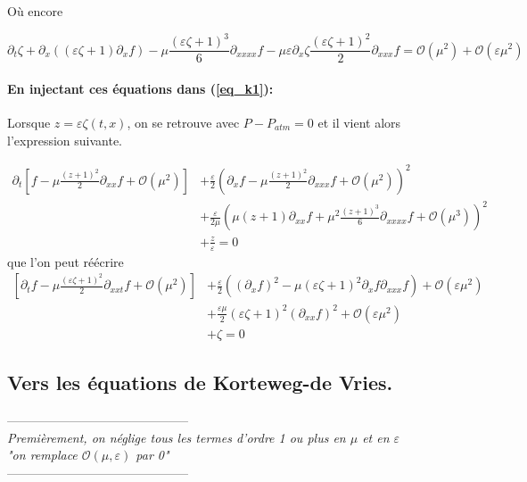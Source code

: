 \documentclass[12pt,a4paper]{article}
\numberwithin{equation}{section}
\begin{document}
Où encore

\begin{equation}
    \partial_{t}\zeta +  \partial_{x}((\varepsilon \zeta+1) \partial_xf)    - \mu\frac{(\varepsilon\zeta+1)^3}{6}\partial_{xxxx}f - \mu \varepsilon\partial_{x}\zeta\frac{(\varepsilon\zeta+1)^2}{2}\partial_{xxx}f= \mathcal{O}(\mu^2) + \mathcal{O}(\varepsilon\mu^2) \label{eq_approx1} 
\end{equation}
\paragraph{En injectant ces équations dans (\ref{eq_k1}):} Lorsque $z = \varepsilon \zeta(t,x)$, on se retrouve avec $P -P_{atm} = 0$ et il vient alors l'expression suivante.

\begin{equation*}
\begin{split}
    \partial_{t}\left[f - \mu\frac{(z+1)^2}{2}\partial_{xx}f + \mathcal{O}(\mu^2)\right] 
    &+\frac{\varepsilon}{2}\left(\partial_xf - \mu\frac{(z+1)^2}{2}\partial_{xxx}f + \mathcal{O}(\mu^2)\right)^2 
     \\&+\frac{\varepsilon}{2\mu}\left(\mu(z+1)\partial_{xx}f + \mu^2\frac{(z+1)^3}{6}\partial_{xxxx}f + \mathcal{O}(\mu^3)\right)^2
     \\&+ \frac{z}{\varepsilon} 
     = 0
\end{split}
\end{equation*}
que l'on peut réécrire
\begin{equation}
\begin{split}
   \left[ \partial_{t}f - \mu\frac{(\varepsilon\zeta+1)^2}{2}\partial_{xxt}f + \mathcal{O}(\mu^2)\right] 
    &+\frac{\varepsilon}{2}\left(  (\partial_xf)^2 -  \mu(\varepsilon\zeta+1)^2 \partial_xf\partial_{xxx}f \right) + \mathcal{O}(\varepsilon\mu^2)   
     \\&+\frac{\varepsilon\mu}{2}(\varepsilon\zeta+1)^2(\partial_{xx}f)^2 +  \mathcal{O}(\varepsilon\mu^2) 
     \\&+  \zeta 
     = 0
\end{split}\label{eq_approx2} 
\end{equation}
\subsection{Vers les équations de Korteweg-de Vries.}
\begin{center}
    --------------------------------------------\\
   \textit{Premièrement, on néglige tous les termes d'ordre 1 ou plus en $\mu$ et en $\varepsilon$}\\
   \textit{"on remplace $\mathcal{O}(\mu,\varepsilon)$ par 0"}\\
   --------------------------------------------
\end{center}
\end{document}
